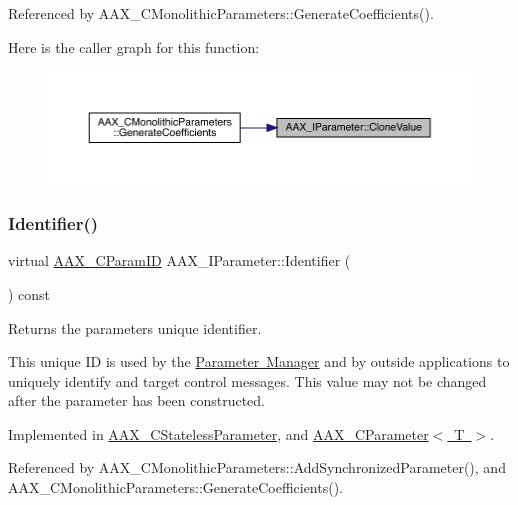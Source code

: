 Referenced by A\+A\+X\+\_\+\+C\+Monolithic\+Parameters\+::\+Generate\+Coefficients().

Here is the caller graph for this function\+:
\nopagebreak
\begin{figure}[H]
\begin{center}
\leavevmode
\includegraphics[width=350pt]{a01857_a85ce34797e0a9bb3cf05458757144cb9_icgraph}
\end{center}
\end{figure}
\mbox{\label{a01857_a28807db424a720daa9880ed9ee5d4d21}} 
\subsubsection{\texorpdfstring{Identifier()}{Identifier()}}
{\footnotesize\ttfamily virtual \mbox{\hyperlink{a00392_a1440c756fe5cb158b78193b2fc1780d1}{A\+A\+X\+\_\+\+C\+Param\+ID}} A\+A\+X\+\_\+\+I\+Parameter\+::\+Identifier (\begin{DoxyParamCaption}{ }\end{DoxyParamCaption}) const\hspace{0.3cm}{\ttfamily [pure virtual]}}



Returns the parameter\textquotesingle{}s unique identifier. 

This unique ID is used by the \mbox{\hyperlink{a00814}{Parameter Manager}} and by outside applications to uniquely identify and target control messages. This value may not be changed after the parameter has been constructed. 

Implemented in \mbox{\hyperlink{a01541_a9ab991e0bad2bc76b7efba3d129f1953}{A\+A\+X\+\_\+\+C\+Stateless\+Parameter}}, and \mbox{\hyperlink{a01537_aedf516885af595cae5d07dee050d9792}{A\+A\+X\+\_\+\+C\+Parameter$<$ T $>$}}.



Referenced by A\+A\+X\+\_\+\+C\+Monolithic\+Parameters\+::\+Add\+Synchronized\+Parameter(), and A\+A\+X\+\_\+\+C\+Monolithic\+Parameters\+::\+Generate\+Coefficients().

